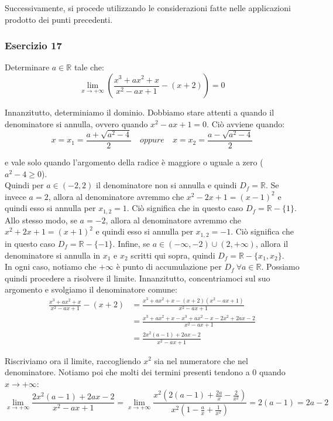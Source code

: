 \documentclass{article}
\begin{document}
\noindent Successivamente, si procede utilizzando le considerazioni fatte nelle applicazioni prodotto dei punti precedenti.

\subsubsection{Esercizio 17}
Determinare $a \in \mathbb{R}$ tale che:
\begin{equation*}
    \lim_{x \to +\infty} \left(\frac{x^3 + ax^2 + x}{x^2 - ax + 1} - (x + 2)\right) = 0
\end{equation*}

\noindent Innanzitutto, determiniamo il dominio. Dobbiamo stare attenti a quando il denominatore si annulla, ovvero quando $x^2 - ax + 1 = 0$. Ciò avviene quando:
\begin{equation*}
    x = x_1 = \frac{a + \sqrt{a^2 - 4}}{2} \quad oppure \quad x = x_2 = \frac{a - \sqrt{a^2 - 4}}{2}
\end{equation*}

\noindent e vale solo quando l'argomento della radice è maggiore o uguale a zero ($a^2 - 4 \geq 0$). \\
Quindi per $a \in (-2, 2)$ il denominatore non si annulla e quindi $D_f = \mathbb{R}$. Se invece $a = 2$, allora al denominatore avremmo che $x^2 - 2x + 1 = (x - 1)^2$ e quindi esso si annulla per $x_{1, 2} = 1$. Ciò significa che in questo caso $D_f = \mathbb{R} - \{1\}$. Allo stesso modo, se $a = -2$, allora al denominatore avremmo che $x^2 + 2x + 1 = (x + 1)^2$ e quindi esso si annulla per $x_{1, 2} = -1$. Ciò significa che in questo caso $D_f = \mathbb{R} - \{-1\}$. Infine, se $a \in (-\infty, -2) \cup (2, +\infty)$, allora il denominatore si annulla in $x_1$ e $x_2$ scritti qui sopra, quindi $D_f = \mathbb{R} - \{x_1, x_2\}$.\\
In ogni caso, notiamo che $+\infty$ è punto di accumulazione per $D_f \ \forall a \in \mathbb{R}$. Possiamo quindi procedere a risolvere il limite. Innanzitutto, concentriamoci sul suo argomento e svolgiamo il denominatore comune:
\begin{align*}
    \frac{x^3 + ax^2 + x}{x^2 - ax + 1} - (x + 2) &= \frac{x^3 + ax^2 + x - (x + 2)(x^2 - ax + 1)}{x^2 - ax + 1} \\
    &= \frac{x^3 + ax^2 + x - x^3 + ax^2 - x - 2x^2 + 2ax - 2}{x^2 - ax + 1} \\
    &= \frac{2x^2(a - 1) + 2ax - 2}{x^2 - ax + 1}
\end{align*}

\noindent Riscriviamo ora il limite, raccogliendo $x^2$ sia nel numeratore che nel denominatore. Notiamo poi che molti dei termini presenti tendono a $0$ quando $x \to +\infty$:
\begin{equation*}
    \lim_{x \to +\infty} \frac{2x^2(a - 1) + 2ax - 2}{x^2 - ax + 1} = \lim_{x \to +\infty} \frac{x^2\left(2(a - 1) + \frac{2a}{x} - \frac{2}{x^2}\right)}{x^2\left(1 - \frac{a}{x} + \frac{1}{x^2}\right)} = 2(a - 1) = 2a - 2
\end{equation*}
\end{document}

